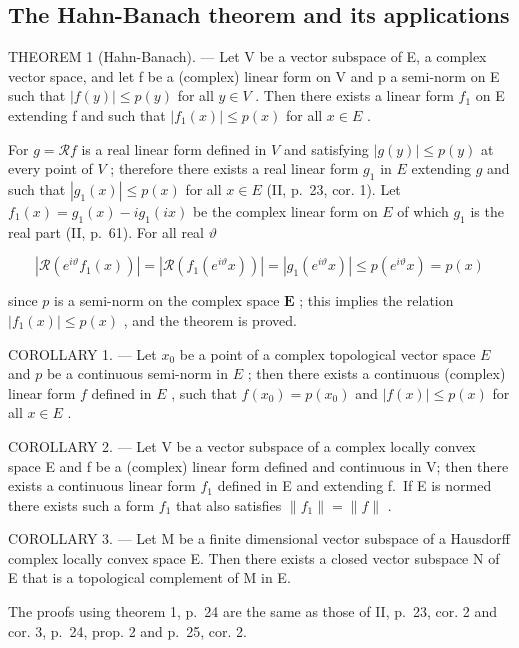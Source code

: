 \subsection{The Hahn-Banach theorem and its applications}

THEOREM 1 (Hahn-Banach). --- Let V be a vector subspace of E, a complex vector space, and let f be a (complex) linear form on V and p a semi-norm on E such that \(|f(y)| \leqslant p(y)\) for all \(y \in V\) . Then there exists a linear form \(f_{1}\) on E extending f and such that \(|f_{1}(x)| \leqslant p(x)\) for all \(x \in E\) .

For \(g = \mathcal{R}f\) is a real linear form defined in \(V\) and satisfying \(|g(y)| \leqslant p(y)\) at every point of \(V\) ; therefore there exists a real linear form \(g_1\) in \(E\) extending \(g\) and such that \(|g_1(x)| \leqslant p(x)\) for all \(x \in E\) (II, p.~23, cor. 1). Let \(f_1(x) = g_1(x) - ig_1(ix)\) be the complex linear form on \(E\) of which \(g_1\) is the real part (II, p.~61). For all real \(\vartheta\)

\[
\left| \mathcal {R} (e ^ {i \vartheta} f _ {1} (x)) \right| = \left| \mathcal {R} (f _ {1} (e ^ {i \vartheta} x)) \right| = \left| g _ {1} (e ^ {i \vartheta} x) \right| \leqslant p (e ^ {i \vartheta} x) = p (x)
\]

since \(p\) is a semi-norm on the complex space \(\mathbf{E}\) ; this implies the relation \(|f_1(x)| \leqslant p(x)\) , and the theorem is proved.

COROLLARY 1. --- Let \(x_0\) be a point of a complex topological vector space \(E\) and \(p\) be a continuous semi-norm in \(E\) ; then there exists a continuous (complex) linear form \(f\) defined in \(E\) , such that \(f(x_0) = p(x_0)\) and \(|f(x)| \leqslant p(x)\) for all \(x \in E\) .

COROLLARY 2. --- Let V be a vector subspace of a complex locally convex space E and f be a (complex) linear form defined and continuous in V; then there exists a continuous linear form \(f_{1}\) defined in E and extending f.~If E is normed there exists such a form \(f_{1}\) that also satisfies \(\|f_{1}\|=\|f\|\) .

COROLLARY 3. --- Let M be a finite dimensional vector subspace of a Hausdorff complex locally convex space E. Then there exists a closed vector subspace N of E that is a topological complement of M in E.

The proofs using theorem 1, p.~24 are the same as those of II, p.~23, cor. 2 and cor. 3, p.~24, prop. 2 and p.~25, cor. 2.

